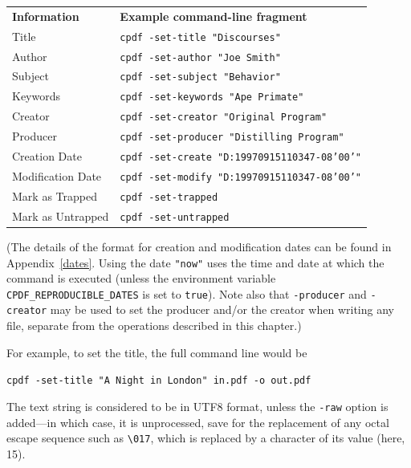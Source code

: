 \documentclass{book}
\begin{document}
{\small\begin{framed}
    \noindent\begin{tabular}{ll}
       \textbf{Information} & \textbf{Example command-line fragment} \\
       Title & \texttt{cpdf -set-title "Discourses"} \\
       Author & \texttt{cpdf -set-author "Joe Smith"} \\
       Subject & \texttt{cpdf -set-subject "Behavior"} \\
       Keywords & \texttt{cpdf -set-keywords "Ape Primate"} \\
       Creator & \texttt{cpdf -set-creator "Original Program"} \\
       Producer & \texttt{cpdf -set-producer "Distilling Program"} \\
       Creation Date & \texttt{cpdf -set-create "D:19970915110347-08'00'"} \\
       Modification Date & \texttt{cpdf -set-modify "D:19970915110347-08'00'"} \\
       Mark as Trapped & \texttt{cpdf -set-trapped} \\
       Mark as Untrapped & \texttt{cpdf -set-untrapped} \\
    \end{tabular}
\end{framed}}

  \noindent (The details of the format for creation and modification dates can be found
in Appendix~\ref{dates}. Using the date \texttt{"now"} uses the time and date
at which the command is executed (unless the environment variable \texttt{CPDF\_REPRODUCIBLE\_DATES} is set to \texttt{true}). Note also that \texttt{-producer} and \texttt{-creator} may be used to set the producer and/or the creator when writing any file, separate from the operations described in this chapter.)
  
  \vspace{2mm}
  For example, to set the title, the full command line would be

  \begin{framed}
    \noindent\small\verb!cpdf -set-title "A Night in London" in.pdf -o out.pdf!
  \end{framed}

\noindent The text string is considered to be in UTF8 format, unless the \texttt{-raw}
option is added---in which case, it is unprocessed, save for the replacement of any octal escape sequence such as \texttt{\textbackslash 017}, which is replaced by a character of its value (here, 15).
\end{document}
